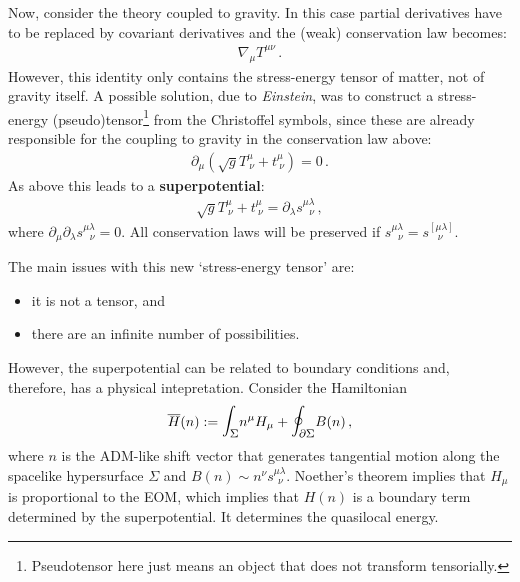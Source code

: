     Now, consider the theory coupled to gravity. In this case partial derivatives have to be replaced by covariant derivatives and the (weak) conservation law becomes:
    \begin{gather}
        \nabla_\mu T^{\mu\nu}\,.
    \end{gather}
    However, this identity only contains the stress-energy tensor of matter, not of gravity itself. A possible solution, due to \textit{Einstein}, was to construct a stress-energy (pseudo)tensor\footnote{Pseudotensor here just means an object that does not transform tensorially.} from the Christoffel symbols, since these are already responsible for the coupling to gravity in the conservation law above:
    \begin{gather}
        \partial_\mu(\sqrt{g}T^\mu_{\ \nu}+t^\mu_{\ \nu}) = 0\,.
    \end{gather}
    As above this leads to a \textbf{superpotential}:
    \begin{gather}
        \sqrt{g}T^\mu_{\ \nu}+t^\mu_{\ \nu} = \partial_\lambda s^{\mu\lambda}_{\ \ \ \nu}\,,
    \end{gather}
    where $\partial_\mu\partial_\lambda s^{\mu\lambda}_{\ \ \ \nu}=0$. All conservation laws will be preserved if $s^{\mu\lambda}_{\ \ \ \nu}=s^{[\mu\lambda]}_{\ \ \ \ \nu}$.

    The main issues with this new `stress-energy tensor' are:
    \begin{itemize}
        \item it is not a tensor, and
        \item there are an infinite number of possibilities.
    \end{itemize}
    However, the superpotential can be related to boundary conditions and, therefore, has a physical intepretation. Consider the Hamiltonian
    \begin{gather}
        \overline{H}(n) := \Int_\Sigma n^\mu H_\mu + \Oint_{\partial\Sigma}B(n)\,,
    \end{gather}
    where $n$ is the ADM-like shift vector that generates tangential motion along the spacelike hypersurface $\Sigma$ and $B(n)\sim n^\nu s^{\mu\lambda}_{\ \ \nu}$. Noether's theorem implies that $H_\mu$ is proportional to the EOM, which implies that $H(n)$ is a boundary term determined by the superpotential. It determines the quasilocal energy.

